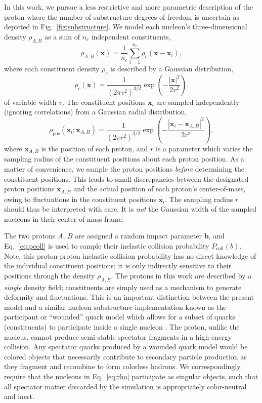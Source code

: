 \documentclass[aps,prc,reprint,amsmath,nofootinbib]{revtex4-1}
\newcommand{\bv}{\mathbf b}
\newcommand{\xv}{\mathbf x}
\begin{document}
In this work, we pursue a less restrictive and more parametric description of the proton where the number of substructure degrees of freedom is uncertain as depicted in Fig.~\ref{fig:substructure}.
We model each nucleon's three-dimensional density $\rho_{A,B}$ as a sum of $n_c$ independent constituents,
\begin{equation}
  \label{eq:rho}
  \rho_{A, B}(\xv) = \frac{1}{n_c} \sum\limits_{i=1}^{n_c} \rho_c(\xv - \xv_i),
\end{equation}
where each constituent density $\rho_c$ is described by a Gaussian distribution,
\begin{equation}
  \rho_c(\xv) = \frac{1}{(2 \pi v^2)^{3/2}} \exp\left(- \frac{|\xv|^2}{2 v^2}\right).
\end{equation}
of variable width $v$.
The constituent positions $\xv_i$ are sampled independently (ignoring correlations) from a Gaussian radial distribution,
\begin{equation}
  \label{eq:radial_dist}
  \rho_\text{pos}(\xv_i; \xv_{A,B}) = \frac{1}{(2\pi r^2)^{3/2}} \exp\left(-\frac{|\xv_i - \xv_{A,B}|^2}{2 r^2}\right),
\end{equation}
where $\xv_{A,B}$ is the position of each proton, and $r$ is a parameter which varies the sampling radius of the constituent positions about each proton position.
As a matter of convenience, we sample the proton positions \emph{before} determining the constituent positions.
This leads to small discrepancies between the designated proton positions $\xv_{A,B}$ and the actual position of each proton's center-of-mass, owing to fluctuations in the constituent positions $\xv_i$.
The sampling radius $r$ should thus be interpreted with care.
It is \emph{not} the Gaussian width of the sampled nucleons in their center-of-mass frame.

The two protons $A$, $B$ are assigned a random impact parameter $\bv$, and Eq.~\eqref{eq:pcoll} is used to sample their inelastic collision probability $P_\mathrm{coll}(b)$.
Note, this proton-proton inelastic collision probability has no direct knowledge of the individual constituent positions; it is only indirectly sensitive to their positions through the density $\rho_{A, B}$.
The protons in this work are described by a \emph{single} density field; constituents are simply used as a mechanism to generate deformity and fluctuations.
This is an important distinction between the present model and a similar nucleon substructure implementation known as the participant or ``wounded'' quark model which allows for a subset of quarks (constituents) to participate inside a single nucleon \cite{ANISOVICH1978477, Broniowski:2016pvx}.
The proton, unlike the nucleus, cannot produce semi-stable spectator fragments in a high-energy collision.
Any spectator quarks produced by a wounded quark model would be colored objects that necessarily contribute to secondary particle production as they fragment and recombine to form colorless hadrons.
We correspondingly require that the nucleons in Eq.~\eqref{eq:rho} participate as singular objects, such that all spectator matter discarded by the simulation is appropriately color-neutral and inert.
\end{document}
